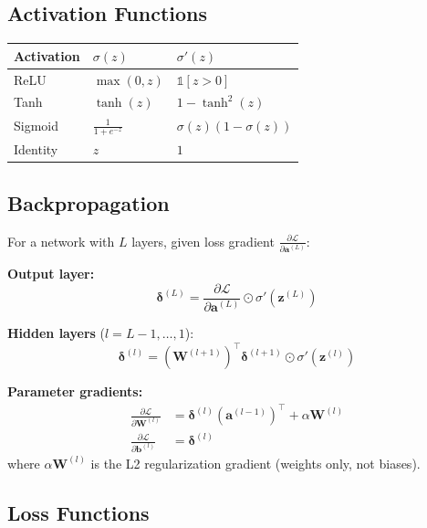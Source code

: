 \documentclass[11pt,a4paper]{article}
\theoremstyle{definition}
\theoremstyle{remark}
\begin{document}
\subsection{Activation Functions}

\begin{center}
\begin{tabular}{lll}
\toprule
Activation & $\sigma(z)$ & $\sigma'(z)$ \\
\midrule
ReLU & $\max(0, z)$ & $\mathbb{1}[z > 0]$ \\
Tanh & $\tanh(z)$ & $1 - \tanh^2(z)$ \\
Sigmoid & $\frac{1}{1+e^{-z}}$ & $\sigma(z)(1-\sigma(z))$ \\
Identity & $z$ & $1$ \\
\bottomrule
\end{tabular}
\end{center}

\subsection{Backpropagation}

For a network with $L$ layers, given loss gradient $\frac{\partial\mathcal{L}}{\partial\mathbf{a}^{(L)}}$:

\textbf{Output layer:}
\begin{equation}
\boldsymbol{\delta}^{(L)} = \frac{\partial\mathcal{L}}{\partial\mathbf{a}^{(L)}} \odot \sigma'(\mathbf{z}^{(L)})
\end{equation}

\textbf{Hidden layers} ($l = L-1, \ldots, 1$):
\begin{equation}
\boldsymbol{\delta}^{(l)} = (\mathbf{W}^{(l+1)})^\top\boldsymbol{\delta}^{(l+1)} \odot \sigma'(\mathbf{z}^{(l)})
\end{equation}

\textbf{Parameter gradients:}
\begin{align}
\frac{\partial\mathcal{L}}{\partial\mathbf{W}^{(l)}} &= \boldsymbol{\delta}^{(l)}(\mathbf{a}^{(l-1)})^\top + \alpha\mathbf{W}^{(l)} \\
\frac{\partial\mathcal{L}}{\partial\mathbf{b}^{(l)}} &= \boldsymbol{\delta}^{(l)}
\end{align}
where $\alpha\mathbf{W}^{(l)}$ is the L2 regularization gradient (weights only, not biases).

\subsection{Loss Functions}
\end{document}
